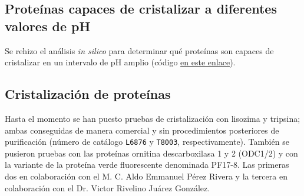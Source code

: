 \documentclass[11pt,letterpaper]{article}
\begin{document}
\subsection{Proteínas capaces de cristalizar a diferentes valores de pH}
Se rehizo el análisis \emph{in silico} para determinar qué proteínas son capaces de cristalizar en un intervalo de pH amplio (código \href{https://github.com/murpholinox/lap_book}{en este enlace}). 
\begin{table}[h]
\centering
{}
\caption{Proteínas capaces de cristalizar en un intervalo de pH amplio.}
\label{tab:lap}
\end{table}
\subsection{Cristalización de proteínas}
Hasta el momento se han puesto pruebas de cristalización con lisozima y tripsina; ambas conseguidas de manera comercial y sin procedimientos posteriores de purificación (número de catálogo \verb|L6876| y \verb|T8003|, respectivamente). También se pusieron pruebas con las proteínas ornitina descarboxilasa 1 y 2 (ODC1/2) y con la variante de la proteína verde fluorescente denominada PF17-8. Las primeras dos en colaboración con el M. C. Aldo Emmanuel Pérez Rivera y la tercera en colaboración con el Dr. Victor Rivelino Juárez González. 
\end{document}
